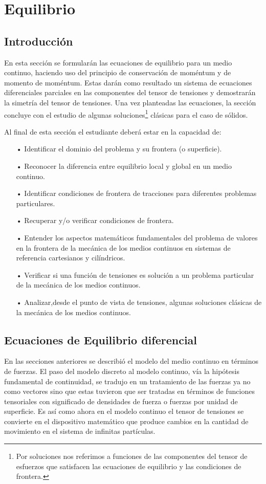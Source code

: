 \documentclass[../notas medios.tex]{subfiles}
\begin{document}
\chapter{Equilibrio}

\graphicspath{{img/equilibrio/}}

\section{Introducción}
En esta sección se formularán las ecuaciones de equilibrio para un medio 
continuo, haciendo uso del principio de conservación de moméntum y de momento 
de moméntum. Estas darán como resultado un sistema de ecuaciones diferenciales 
parciales en las componentes del tensor de tensiones y demostrarán la simetría 
del tensor de tensiones. Una vez planteadas las ecuaciones, la sección concluye 
con el estudio de algunas soluciones\footnote{Por soluciones nos referimos a 
funciones de las componentes del tensor de esfuerzos que satisfacen las 
ecuaciones de equilibrio y las condiciones de frontera.} clásicas para el caso 
de sólidos.

Al final de esta sección el estudiante deberá estar en la capacidad de:

\begin{itemize}
\item[•] Identificar el dominio del problema y su frontera (o superficie).
\item[•] Reconocer la diferencia entre equilibrio local y global en un medio continuo.
\item[•] Identificar condiciones de frontera de tracciones para diferentes problemas particulares.
\item[•] Recuperar y/o verificar condiciones de frontera.
\item[•] Entender los aspectos matemáticos fundamentales del problema de valores en la frontera de la mecánica de los medios continuos en sistemas de referencia cartesianos y cilíndricos.
\item[•] Verificar si una función de tensiones es solución a un problema particular de la mecánica de los medios continuos.
\item[•] Analizar,desde el punto de vista de tensiones, algunas soluciones clásicas de la mecánica de los medios continuos.
\end{itemize}


\section{Ecuaciones de Equilibrio diferencial}
En las secciones anteriores se describió el modelo del medio continuo en términos de fuerzas.  El paso del modelo discreto al modelo continuo, vía la hipótesis fundamental de continuidad, se tradujo en un tratamiento de las fuerzas ya no como vectores sino que estas tuvieron que ser tratadas en términos de funciones tensoriales con significado de densidades de fuerza o fuerzas por unidad de superficie.  Es así como ahora en el modelo continuo el tensor de tensiones se convierte en el dispositivo matemático que produce cambios en la cantidad de movimiento en el sistema de infinitas partículas.
\end{document}
